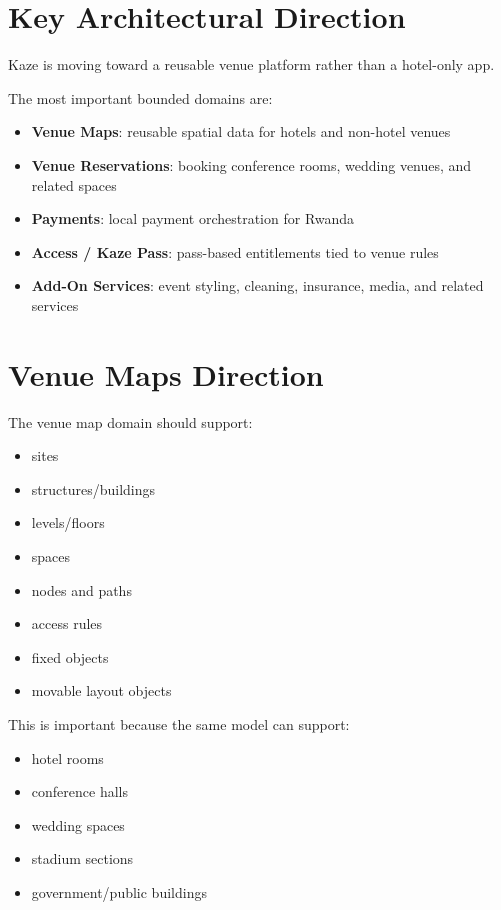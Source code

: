 \documentclass[11pt,a4paper]{article}
\begin{document}
\section{Key Architectural Direction}

Kaze is moving toward a reusable venue platform rather than a hotel-only app.

The most important bounded domains are:
\begin{itemize}
    \item \textbf{Venue Maps}: reusable spatial data for hotels and non-hotel venues
    \item \textbf{Venue Reservations}: booking conference rooms, wedding venues, and related spaces
    \item \textbf{Payments}: local payment orchestration for Rwanda
    \item \textbf{Access / Kaze Pass}: pass-based entitlements tied to venue rules
    \item \textbf{Add-On Services}: event styling, cleaning, insurance, media, and related services
\end{itemize}

\section{Venue Maps Direction}

The venue map domain should support:
\begin{itemize}
    \item sites
    \item structures/buildings
    \item levels/floors
    \item spaces
    \item nodes and paths
    \item access rules
    \item fixed objects
    \item movable layout objects
\end{itemize}

This is important because the same model can support:
\begin{itemize}
    \item hotel rooms
    \item conference halls
    \item wedding spaces
    \item stadium sections
    \item government/public buildings
\end{itemize}
\end{document}
